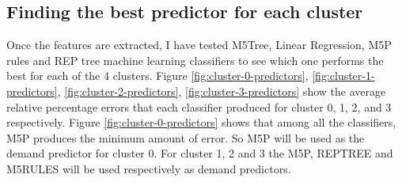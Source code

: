 \subsection {Finding the best predictor for each cluster}
Once the features are extracted, I have tested  M5Tree, Linear Regression, M5P rules and REP tree machine learning classifiers to see which one performs the best for each of the 4 clusters. Figure \ref{fig:cluster-0-predictors}, \ref{fig:cluster-1-predictors}, \ref{fig:cluster-2-predictors}, \ref{fig:cluster-3-predictors} show the average relative percentage errors that each classifier produced for cluster 0, 1, 2, and 3 respectively. Figure \ref{fig:cluster-0-predictors} shows that among all the classifiers, M5P produces the minimum amount of error. So M5P will be used as the demand predictor for cluster 0. For cluster 1, 2 and 3 the M5P, REPTREE and M5RULES will be used respectively as demand predictors.

